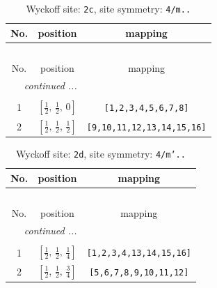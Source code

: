 \documentclass[fleqn,8pt]{jsarticle}
\begin{document}
\renewcommand{\arraystretch}{1.2}
\begin{longtable}{ccc}
\caption{Wyckoff site: {\tt 2c}, site symmetry: {\tt 4/m..}}
 \\
 \hline \hline
No. & position & mapping \\ \hline \endfirsthead

\multicolumn{2}{l}{\tablename\ \thetable{}} \\
 \hline \hline
No. & position & mapping \\ \hline \endhead

 \hline \hline
\multicolumn{2}{r}{\footnotesize\it continued ...} \\ \endfoot

 \hline \hline
\multicolumn{2}{r}{} \\ \endlastfoot

1 & $\left[ \frac{1}{2},\, \frac{1}{2},\, 0 \right]$ & {\tt [1,2,3,4,5,6,7,8]} \\ \hline
2 & $\left[ \frac{1}{2},\, \frac{1}{2},\, \frac{1}{2} \right]$ & {\tt [9,10,11,12,13,14,15,16]} \\
\end{longtable}
\renewcommand{\arraystretch}{1.2}
\begin{longtable}{ccc}
\caption{Wyckoff site: {\tt 2d}, site symmetry: {\tt 4/m'..}}
 \\
 \hline \hline
No. & position & mapping \\ \hline \endfirsthead

\multicolumn{2}{l}{\tablename\ \thetable{}} \\
 \hline \hline
No. & position & mapping \\ \hline \endhead

 \hline \hline
\multicolumn{2}{r}{\footnotesize\it continued ...} \\ \endfoot

 \hline \hline
\multicolumn{2}{r}{} \\ \endlastfoot

1 & $\left[ \frac{1}{2},\, \frac{1}{2},\, \frac{1}{4} \right]$ & {\tt [1,2,3,4,13,14,15,16]} \\ \hline
2 & $\left[ \frac{1}{2},\, \frac{1}{2},\, \frac{3}{4} \right]$ & {\tt [5,6,7,8,9,10,11,12]} \\
\end{longtable}
\renewcommand{\arraystretch}{1.2}
\end{document}
